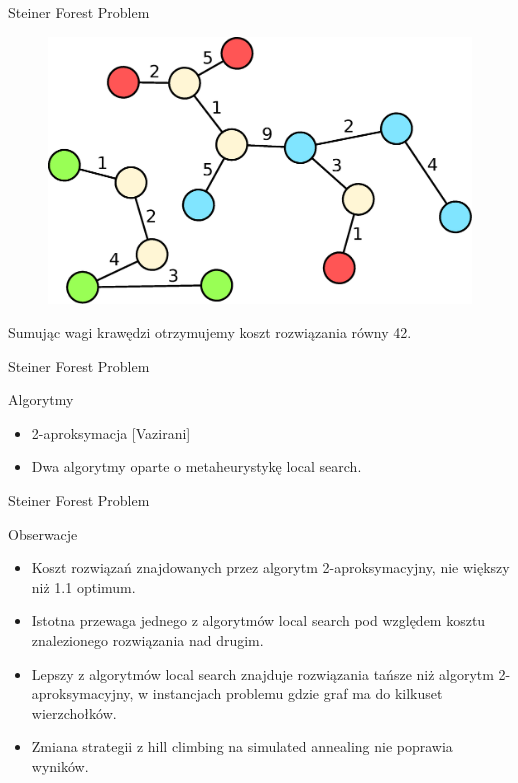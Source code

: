 \begin{frame}{Steiner Forest Problem}
\begin{figure}[ht]
\includegraphics[scale=0.32]{sf_example3.eps}
\end{figure}
Sumując wagi krawędzi otrzymujemy koszt rozwiązania równy 42.
\end{frame}

\begin{frame}{Steiner Forest Problem}
\begin{block}{Algorytmy}
\begin{itemize}
\item 2-aproksymacja [Vazirani]
\item Dwa algorytmy oparte o metaheurystykę local search.
\end{itemize}
\end{block}
\end{frame}

\begin{frame}{Steiner Forest Problem}
\begin{block}{Obserwacje}
\begin{itemize}
\item Koszt rozwiązań znajdowanych przez algorytm 2-aproksymacyjny, nie większy niż 1.1 optimum.
\item Istotna przewaga jednego z algorytmów local search pod względem kosztu znalezionego rozwiązania nad drugim.
\item Lepszy z algorytmów local search znajduje rozwiązania tańsze niż algorytm 2-aproksymacyjny, w instancjach problemu gdzie graf ma do kilkuset wierzchołków.
\item Zmiana strategii z hill climbing na simulated annealing nie poprawia wyników.
\end{itemize}
\end{block}
\end{frame}
